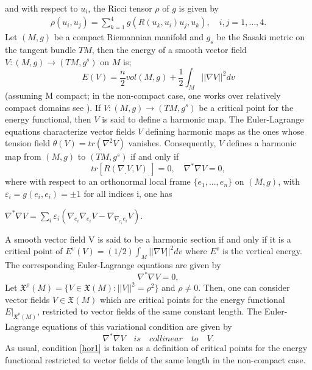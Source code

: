 \documentclass[11pt,oneside,leqno]{amsart}
\theoremstyle{plain}
\begin{document}
and with respect to $u_i$, the Ricci tensor $\rho$ of $g$  is given by
\begin{eqnarray}\label{ric2}
\rho (u_i ,u_j)=\sum_{k=1}^4g(R(u_k,u_i)u_j,u_k),\quad i,j=1,\dots,4.
\end{eqnarray}
Let $(M,g)$ be a compact Riemannian manifold and $g_s$ be the Sasaki metric
on the tangent bundle $TM$, then the energy of a smooth vector field $V:(M,g)\longrightarrow
(TM,g^s)$ on $M$ is;
\begin{equation}\label{enr}
E(V)=\dfrac{n}{2}vol (M,g)+\dfrac{1}{2}\int_M ||\nabla V||^2dv
\end{equation}
(assuming M compact; in the non-compact case, one works over relatively compact domains see \cite{c1}). If $V:(M,g)\longrightarrow (TM,g^s)$ be a critical point for the energy functional, then $V$ is said to define a harmonic map. The Euler-Lagrange equations characterize vector fields $V$ defining harmonic maps as the ones whose tension field ${{\theta}}(V)=tr(\nabla^2V)$ vanishes.
 Consequently,
$V$ defines a harmonic map from $(M,g)$ to $(TM,g^s)$ if and only if
\begin{equation}\label{hor}
 tr[R(\nabla_. V,V)_.]=0, \quad  \nabla^*\nabla V=0,
\end{equation}
where with respect to an orthonormal local frame $\lbrace e_1,...,e_n\rbrace$ on $(M,g)$, with $\varepsilon_i=g(e_i,e_i)=\pm1$ for all indices i,
one has
\begin{center}
$ \nabla^*\nabla V=\sum_i \varepsilon_i( \nabla_{e_i}\nabla_{e_i} V-\nabla_{\nabla_{e_i}e_i}V)$.   
\end{center}
A smooth vector field V is said to be a harmonic
section if and only if it is a critical point of $E^v(V)=(1/2)\int_M||\nabla V||^2dv$ where $E^v$ is the vertical energy. The corresponding Euler-Lagrange equations are given by
\begin{equation}
 \nabla^*\nabla V=0,
\end{equation}
Let $\mathfrak{X}^{\rho}(M) =\lbrace V\in \mathfrak{X}(M): ||V||^2=\rho^2 \rbrace$ and $\rho\neq 0$. Then, one can consider vector fields $ V\in \mathfrak{X}(M)$
which are critical points for the energy functional $E
|_{\mathfrak{X}^{\rho}(M)}$, restricted to vector fields of the same constant length. The
Euler-Lagrange equations of this variational condition are given by
\begin{equation}\label{hor1}
\nabla^*\nabla V\quad is\quad collinear\quad to\quad V.   
\end{equation}
As usual, condition \eqref{hor1} is taken as a definition
of critical points for the energy functional restricted to vector fields of the same length in the non-compact case.
\end{document}
